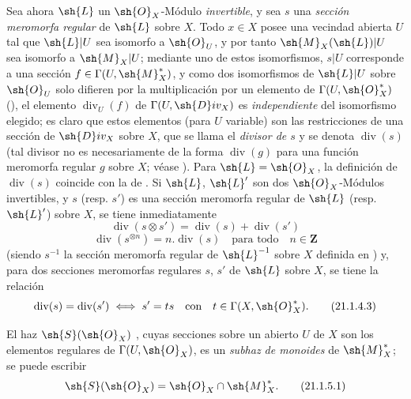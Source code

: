 \begin{env}[21.1.4]
\label{IV.21.1.4}
Sea ahora $\sh{L}$ un $\sh{O}_X$-Módulo \emph{invertible}, y sea $s$ una \emph{sección meromorfa regular}  de $\sh{L}$ sobre $X$.
Todo $x\in X$ posee una vecindad abierta $U$ tal que $\sh{L}|U$ sea isomorfo a $\sh{O}_U$, y por tanto $\sh{M}_X(\sh{L})|U$ sea isomorfo a $\sh{M}_X|U$;
mediante uno de estos isomorfismos, $s|U$ corresponde a una sección $f\in\Gamma(U,\sh{M}_X^*)$, y como dos isomorfismos de $\sh{L}|U$ sobre $\sh{O}_U$ solo difieren por la multiplicación por un elemento de $\Gamma(U,\sh{O}_X^*)$ (), el elemento $\operatorname{div}_U(f)$ de $\Gamma(U,\sh{D}iv_X)$ es \emph{independiente} del isomorfismo elegido;
es claro que estos elementos (para $U$ variable) son las restricciones de una sección de $\sh{D}iv_X$ sobre $X$, que se llama el \emph{divisor de $s$} y se denota $\operatorname{div}(s)$ (tal divisor no es necesariamente de la forma $\operatorname{div}(g)$ para una función meromorfa regular $g$ sobre $X$; véase ).
Para $\sh{L}=\sh{O}_X$, la definición de $\operatorname{div}(s)$ coincide con la de .
Si $\sh{L}$, $\sh{L}'$ son dos $\sh{O}_X$-Módulos invertibles, y $s$ (resp. $s'$) es una sección meromorfa regular de $\sh{L}$ (resp. $\sh{L}'$) sobre $X$, se tiene inmediatamente
\[
\label{IV.21.1.4.1}
  \operatorname{div}(s\otimes s')=\operatorname{div}(s)+\operatorname{div}(s')
  \tag{21.1.4.1}
\]
\[
\label{IV.21.1.4.2}
  \operatorname{div}(s^{\otimes n})=n.\operatorname{div}(s) \quad\text{para todo}\quad n\in\mathbf{Z}
  \tag{21.1.4.2}
\]
(siendo $s^{-1}$ la sección meromorfa regular de $\sh{L}^{-1}$ sobre $X$ definida en )
y, para dos secciones meromorfas regulares $s$, $s'$ de $\sh{L}$ sobre $X$, se tiene la relación
\[
\label{IV.21.1.4.3}
  \operatorname{div}(s)=\operatorname{div}(s') \iff s'=ts \quad\text{con}\quad t\in\Gamma(X,\sh{O}_X^*).
  \tag{21.1.4.3}
\]
\end{env}

\begin{env}[21.1.5]
\label{IV.21.1.5}
El haz $\sh{S}(\sh{O}_X)$ , cuyas secciones sobre un abierto $U$ de $X$ son los elementos regulares de $\Gamma(U,\sh{O}_X)$, es un \emph{subhaz de monoides} de $\sh{M}_X^*$; se puede escribir
\[
\label{IV.21.1.5.1}
  \sh{S}(\sh{O}_X)=\sh{O}_X\cap\sh{M}_X^*.
  \tag{21.1.5.1}
\]
\end{env}


